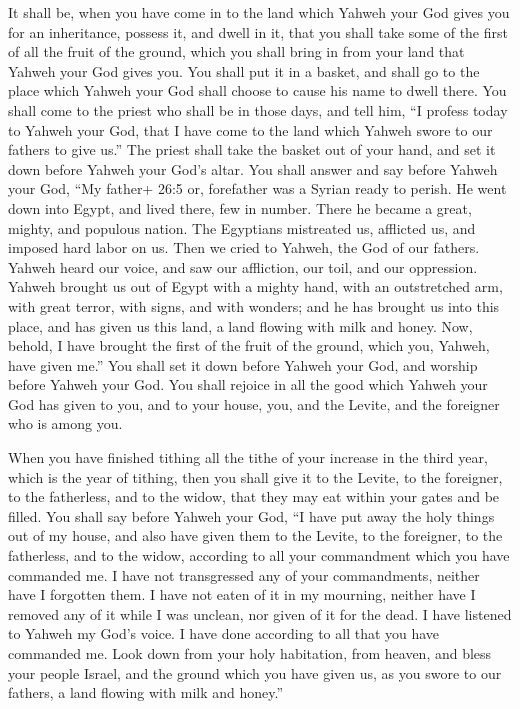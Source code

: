  It shall be, when you have come in to the land which Yahweh
your God gives you for an inheritance, possess it, and dwell in it,
 that you shall take some of the first of all the fruit of
the ground, which you shall bring in from your land that Yahweh your God
gives you. You shall put it in a basket, and shall go to the place which
Yahweh your God shall choose to cause his name to dwell there.
 You shall come to the priest who shall be in those days,
and tell him, ``I profess today to Yahweh your God, that I have come to
the land which Yahweh swore to our fathers to give us.'' 
The priest shall take the basket out of your hand, and set it down
before Yahweh your God's altar.  You shall answer and say
before Yahweh your God, ``My father+ 26:5 or, forefather was a Syrian
ready to perish. He went down into Egypt, and lived there, few in
number. There he became a great, mighty, and populous nation.
 The Egyptians mistreated us, afflicted us, and imposed hard
labor on us.  Then we cried to Yahweh, the God of our
fathers. Yahweh heard our voice, and saw our affliction, our toil, and
our oppression.  Yahweh brought us out of Egypt with a
mighty hand, with an outstretched arm, with great terror, with signs,
and with wonders;  and he has brought us into this place,
and has given us this land, a land flowing with milk and honey.
 Now, behold, I have brought the first of the fruit of the
ground, which you, Yahweh, have given me.'' You shall set it down before
Yahweh your God, and worship before Yahweh your God.  You
shall rejoice in all the good which Yahweh your God has given to you,
and to your house, you, and the Levite, and the foreigner who is among
you.

 When you have finished tithing all the tithe of your
increase in the third year, which is the year of tithing, then you shall
give it to the Levite, to the foreigner, to the fatherless, and to the
widow, that they may eat within your gates and be filled. 
You shall say before Yahweh your God, ``I have put away the holy things
out of my house, and also have given them to the Levite, to the
foreigner, to the fatherless, and to the widow, according to all your
commandment which you have commanded me. I have not transgressed any of
your commandments, neither have I forgotten them.  I have
not eaten of it in my mourning, neither have I removed any of it while I
was unclean, nor given of it for the dead. I have listened to Yahweh my
God's voice. I have done according to all that you have commanded me.
 Look down from your holy habitation, from heaven, and
bless your people Israel, and the ground which you have given us, as you
swore to our fathers, a land flowing with milk and honey.''

